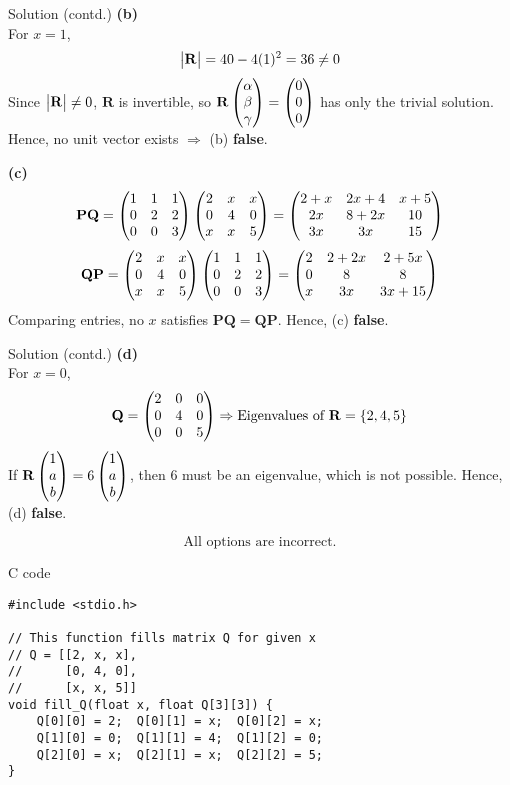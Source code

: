 \documentclass{beamer}
\renewcommand{\vec}[1]{\mathbf{#1}}
\begin{document}
\begin{frame}{Solution (contd.)}
\textbf{(b)}\\[-2mm]
For $x=1$,
\[
\mydet{\vec{R}} = 40 - 4(1)^2 = 36 \neq 0
\]
Since $\mydet{\vec{R}} \neq 0$, $\vec{R}$ is invertible,  
so $\vec{R}\myvec{\alpha\\ \beta\\ \gamma} = \myvec{0\\ 0\\ 0}$  
has only the trivial solution.  
Hence, no unit vector exists $\Rightarrow$ (b) \textbf{false}.

\textbf{(c)}\\[-2mm]
\[
\vec{P}\vec{Q}
=\myvec{1 & 1 & 1\\ 0 & 2 & 2\\ 0 & 0 & 3}
\myvec{2 & x & x\\ 0 & 4 & 0\\ x & x & 5}
=\myvec{2+x & 2x+4 & x+5\\ 2x & 8+2x & 10\\ 3x & 3x & 15}
\]
\[
\vec{Q}\vec{P}
=\myvec{2 & x & x\\ 0 & 4 & 0\\ x & x & 5}
\myvec{1 & 1 & 1\\ 0 & 2 & 2\\ 0 & 0 & 3}
=\myvec{2 & 2+2x & 2+5x\\ 0 & 8 & 8\\ x & 3x & 3x+15}
\]
Comparing entries, no $x$ satisfies $\vec{P}\vec{Q}=\vec{Q}\vec{P}$.  
Hence, (c) \textbf{false}.
\end{frame}

\begin{frame}{Solution (contd.)}
\textbf{(d)}\\[-2mm]
For $x=0$,
\[
\vec{Q}=\myvec{2 & 0 & 0\\ 0 & 4 & 0\\ 0 & 0 & 5}
\Rightarrow \text{Eigenvalues of }\vec{R}=\{2,4,5\}
\]
If $\vec{R}\myvec{1\\ a\\ b}=6\myvec{1\\ a\\ b}$,  
then $6$ must be an eigenvalue, which is not possible.  
Hence, (d) \textbf{false}.

\[
\boxed{\text{All options are incorrect.}}
\]
\end{frame}

\begin{frame}[fragile]{C code}
\begin{lstlisting}
#include <stdio.h>

// This function fills matrix Q for given x
// Q = [[2, x, x],
//      [0, 4, 0],
//      [x, x, 5]]
void fill_Q(float x, float Q[3][3]) {
    Q[0][0] = 2;  Q[0][1] = x;  Q[0][2] = x;
    Q[1][0] = 0;  Q[1][1] = 4;  Q[1][2] = 0;
    Q[2][0] = x;  Q[2][1] = x;  Q[2][2] = 5;
}

\end{lstlisting}
\end{frame}
\end{document}
